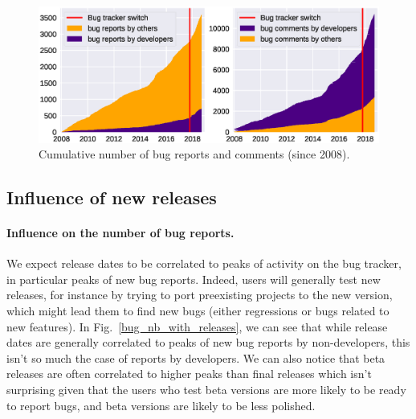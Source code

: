 \documentclass[runningheads]{llncs}
\begin{document}
\begin{figure}
\includegraphics[width=\textwidth]{cumulative_bugs_and_comments.eps}
\caption{Cumulative number of bug reports and comments (since 2008).} \label{cumulative_bugs_and_comments}
\end{figure}

\subsection{Influence of new releases}
\label{influence_release}

\paragraph{Influence on the number of bug reports.}
We expect release dates to be correlated to peaks of activity on the bug tracker, in particular peaks of new bug reports. Indeed, users will generally test new releases, for instance by trying to port preexisting projects to the new version, which might lead them to find new bugs (either regressions or bugs related to new features). In Fig.~\ref{bug_nb_with_releases}, we can see that while release dates are generally correlated to peaks of new bug reports by non-developers, this isn't so much the case of reports by developers. We can also notice that beta releases are often correlated to higher peaks than final releases which isn't surprising given that the users who test beta versions are more likely to be ready to report bugs, and beta versions are likely to be less polished.
\end{document}
